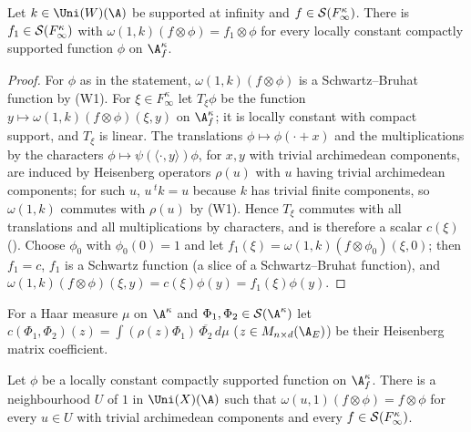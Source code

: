 \begin{lemma}\label{pf:tlift:archop}
Let $k\in\Uni(W)(\A)$ be supported at infinity and $f\in\mathcal{S}(F_\infty^\kappa)$. There is $f_1\in\mathcal{S}(F_\infty^\kappa)$ with
$\omega(1,k)(f\otimes\phi)=f_1\otimes\phi$ for every locally constant compactly supported function $\phi$ on $\A_f^\kappa$.
\end{lemma}

\begin{proof}
For $\phi$ as in the statement, $\omega(1,k)(f\otimes\phi)$ is a Schwartz--Bruhat function by (W1). For $\xi\in F_\infty^\kappa$ let $T_\xi\phi$ be
the function $y\mapsto\omega(1,k)(f\otimes\phi)(\xi,y)$ on $\A_f^\kappa$; it is locally constant with compact support, and $T_\xi$ is linear.
The translations $\phi\mapsto\phi(\cdot+x)$ and the multiplications by the characters $\phi\mapsto\psi(\langle\cdot,y\rangle)\phi$, for $x,y$ with
trivial archimedean components, are induced by Heisenberg operators $\rho(u)$ with $u$ having trivial archimedean components;
for such $u$, $u\,{}^tk=u$ because $k$ has trivial finite components, so $\omega(1,k)$ commutes with $\rho(u)$ by (W1). Hence $T_\xi$
commutes with all translations and all multiplications by characters, and is therefore a scalar $c(\xi)$
(). Choose $\phi_0$ with $\phi_0(0)=1$ and let
$f_1(\xi)=\omega(1,k)(f\otimes\phi_0)(\xi,0)$; then $f_1=c$, $f_1$ is a Schwartz function (a slice of a Schwartz--Bruhat function),
and $\omega(1,k)(f\otimes\phi)(\xi,y)=c(\xi)\phi(y)=f_1(\xi)\phi(y)$.
\end{proof}

For a Haar measure $\mu$ on $\A^\kappa$ and $\Phi_1,\Phi_2\in\tliftS(\A^\kappa)$ let
$c(\Phi_1,\Phi_2)(z)=\int(\rho(z)\Phi_1)\,\overline{\Phi_2}\,d\mu$ ($z\in M_{n\times d}(\tliftAE)$) be their Heisenberg matrix coefficient.

\begin{lemma}\label{pf:tlift:nhdsfix}
Let $\phi$ be a locally constant compactly supported function on $\A_f^\kappa$. There is a neighbourhood $U$ of $1$ in $\Uni(X)(\A)$ such that
$\omega(u,1)(f\otimes\phi)=f\otimes\phi$ for every $u\in U$ with trivial archimedean components and every $f\in\mathcal{S}(F_\infty^\kappa)$.
\end{lemma}


